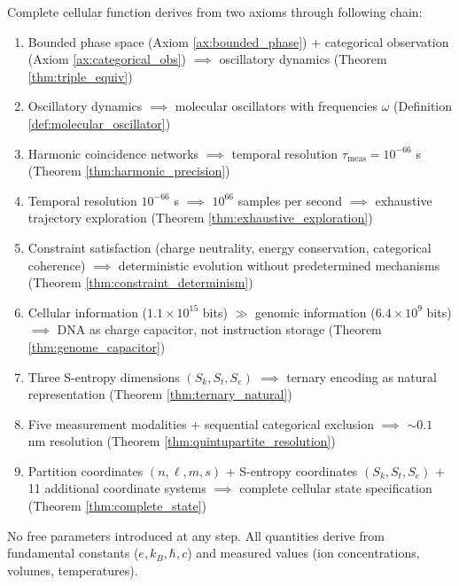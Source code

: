 \documentclass[11pt,a4paper]{article}
\theoremstyle{remark}
\newcommand{\Sk}{S_k}
\newcommand{\St}{S_t}
\newcommand{\Se}{S_e}
\begin{document}
Complete cellular function derives from two axioms through following chain:

\begin{enumerate}
\item Bounded phase space (Axiom \ref{ax:bounded_phase}) + categorical observation (Axiom \ref{ax:categorical_obs}) $\implies$ oscillatory dynamics (Theorem \ref{thm:triple_equiv})

\item Oscillatory dynamics $\implies$ molecular oscillators with frequencies $\omega$ (Definition \ref{def:molecular_oscillator})

\item Harmonic coincidence networks $\implies$ temporal resolution $\tau_{\text{meas}} = 10^{-66}$ s (Theorem \ref{thm:harmonic_precision})

\item Temporal resolution $10^{-66}$ s $\implies$ $10^{66}$ samples per second $\implies$ exhaustive trajectory exploration (Theorem \ref{thm:exhaustive_exploration})

\item Constraint satisfaction (charge neutrality, energy conservation, categorical coherence) $\implies$ deterministic evolution without predetermined mechanisms (Theorem \ref{thm:constraint_determinism})

\item Cellular information ($1.1 \times 10^{15}$ bits) $\gg$ genomic information ($6.4 \times 10^9$ bits) $\implies$ DNA as charge capacitor, not instruction storage (Theorem \ref{thm:genome_capacitor})

\item Three S-entropy dimensions $(\Sk, \St, \Se)$ $\implies$ ternary encoding as natural representation (Theorem \ref{thm:ternary_natural})

\item Five measurement modalities + sequential categorical exclusion $\implies$ $\sim 0.1$ nm resolution (Theorem \ref{thm:quintupartite_resolution})

\item Partition coordinates $(n,\ell,m,s)$ + S-entropy coordinates $(\Sk,\St,\Se)$ + 11 additional coordinate systems $\implies$ complete cellular state specification (Theorem \ref{thm:complete_state})
\end{enumerate}

No free parameters introduced at any step. All quantities derive from fundamental constants ($e, k_B, \hbar, c$) and measured values (ion concentrations, volumes, temperatures).
\end{document}
